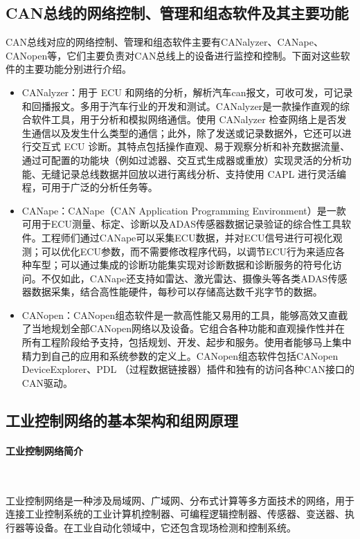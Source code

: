 \documentclass[UTF8]{article}
\begin{document}
\subsection{CAN总线的网络控制、管理和组态软件及其主要功能}
CAN总线对应的网络控制、管理和组态软件主要有CANalyzer、CANape、CANopen等，它们主要负责对CAN总线上的设备进行监控和控制。下面对这些软件的主要功能分别进行介绍。

\begin{itemize}
	\item CANalyzer：用于 ECU 和网络的分析，解析汽车can报文，可收可发，可记录和回播报文。多用于汽车行业的开发和测试。CANalyzer是一款操作直观的综合软件工具，用于分析和模拟网络通信。使用 CANalyzer 检查网络上是否发生通信以及发生什么类型的通信；此外，除了发送或记录数据外，它还可以进行交互式 ECU 诊断。其特点包括操作直观、易于观察分析和补充数据流量、通过可配置的功能块（例如过滤器、交互式生成器或重放）实现灵活的分析功能、无缝记录总线数据并回放以进行离线分析、支持使用 CAPL 进行灵活编程，可用于广泛的分析任务等。
	\item CANape：CANape（CAN Application Programming Environment）是一款可用于ECU测量、标定、诊断以及ADAS传感器数据记录验证的综合性工具软件。工程师们通过CANape可以采集ECU数据，并对ECU信号进行可视化观测；可以优化ECU参数，而不需要修改程序代码，以调节ECU行为来适应各种车型；可以通过集成的诊断功能集实现对诊断数据和诊断服务的符号化访问。不仅如此，CANape还支持如雷达、激光雷达、摄像头等各类ADAS传感器数据采集，结合高性能硬件，每秒可以存储高达数千兆字节的数据。
	\item CANopen：CANopen组态软件是一款高性能又易用的工具，能够高效又直截了当地规划全部CANopen网络以及设备。它组合各种功能和直观操作性并在所有工程阶段给予支持，包括规划、开发、起步和服务。使用者能够马上集中精力到自己的应用和系统参数的定义上。CANopen组态软件包括CANopen DeviceExplorer、PDL （过程数据链接器）插件和独有的访问各种CAN接口的CAN驱动。

\end{itemize}

\subsection{工业控制网络的基本架构和组网原理}
\paragraph{工业控制网络简介}~{}

工业控制网络是一种涉及局域网、广域网、分布式计算等多方面技术的网络，用于连接工业控制系统的工业计算机控制器、可编程逻辑控制器、传感器、变送器、执行器等设备。在工业自动化领域中，它还包含现场检测和控制系统。
\end{document}
